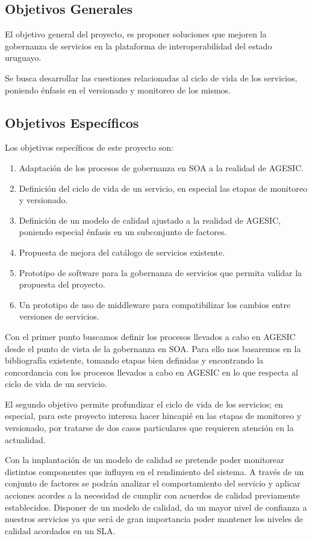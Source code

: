 \subsection{Objetivos Generales}
\label{capitulo1:Objetivos_Generales}
El objetivo general del proyecto, es proponer soluciones que mejoren la gobernanza de servicios en la plataforma de interoperabilidad del estado uruguayo.

Se busca desarrollar las cuestiones relacionadas al ciclo de vida de los servicios, poniendo énfasis en el versionado y monitoreo de los mismos.
\subsection{Objetivos Específicos}
\label{capitulo1:Objetivos_Especificos}
Los objetivos específicos de este proyecto son:
\begin{enumerate}

	\item	Adaptación de los procesos de gobernanza en SOA a la realidad de AGESIC.
	\item	Definición del ciclo de vida de un servicio, en especial las etapas de monitoreo y versionado.
	\item	Definición de un modelo de calidad ajustado a la realidad de AGESIC, poniendo especial énfasis en un subconjunto de factores.
	\item	Propuesta de mejora del catálogo de servicios existente.
	\item	Prototipo de software para la gobernanza de servicios que permita validar la propuesta del proyecto.
	\item	Un prototipo de uso de middleware para compatibilizar los cambios entre versiones de servicios.
\end{enumerate}

Con el primer punto buscamos definir los procesos llevados a cabo en AGESIC desde el punto de vista de la gobernanza en SOA. Para ello nos basaremos en la bibliografía existente, tomando etapas bien definidas y encontrando la concordancia con los procesos llevados a cabo en AGESIC en lo que respecta al ciclo de vida de un servicio.

El segundo objetivo permite profundizar el ciclo de vida de los servicios; en especial, para este proyecto interesa hacer hincapié en las etapas de monitoreo y versionado, por tratarse de dos casos particulares que requieren atención en la actualidad.

Con la implantación de un modelo de calidad se pretende poder monitorear distintos componentes que influyen en el rendimiento del sistema. A través de un conjunto de factores se podrán analizar el comportamiento del servicio y aplicar acciones acordes a la necesidad de cumplir con acuerdos de calidad previamente establecidos. Disponer de un modelo de calidad, da un mayor nivel de confianza a nuestros servicios ya que será de gran importancia poder mantener los niveles de calidad acordados en un SLA.


